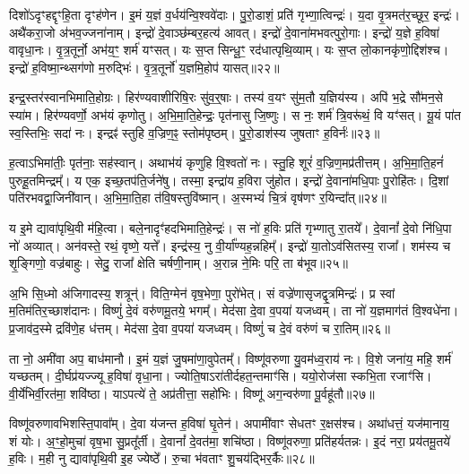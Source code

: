 दिशो॑\-ऽदृꣳहद्दृꣳहि॒ता दृꣳह॑णेन।
इ॒मं य॒ज्ञं व॒र्धय॑न्वि॒श्व\-वे॑दाः।
पु॒रो॒डाशं॒ प्रति॑ गृभ्णा॒त्विन्द्रः॑।
य॒दा वृ॒त्रमत॑र॒च्छूर॒ इन्द्रः॑।
अथै॑करा॒जो अ॑भव॒ज्जना॑नाम्।
इन्द्रो॑ दे॒वाञ्छ॑म्बर॒हत्य॑ आवत्।
इन्द्रो॑ दे॒वाना॑मभवत्पुरो॒गाः।
इन्द्रो॑ य॒ज्ञे ह॒विषा॑ वावृधा॒नः।
वृ॒त्र॒तूर्नो॒ अभ॑य॒ꣳ॒ शर्म॑ यꣳसत्।
यः स॒प्त सिन्धू॒ꣳ॒ रद॑धात्पृथि॒व्याम्।
यः स॒प्त लो॒कानकृ॑णो॒द्दिश॑श्च।
इन्द्रो॑ ह॒विष्मा॒न्थ्सग॑णो म॒रुद्भिः॑।
वृ॒त्र॒तूर्नो॑ य॒ज्ञमि॒होप॑ यासत्॥२२॥\ip\anuvakamend[व॒व॒र्थ॒ वि॒थ्स॒ इन्द्र॑स्तु॒राया᳚स्तु वृत्र॒तूर्ये॒ वज्र॑बाहुः पृथि॒व्यान्त्रीणि॑ च]

इन्द्र॒स्तर॑स्वानभिमाति॒होग्रः।
हिर॑ण्यवाशीरिषि॒रः सु॑व॒र्॒षाः।
तस्य॑ व॒यꣳ सु॑म॒तौ य॒ज्ञिय॑स्य।
अपि॑ भ॒द्रे सौ॑मन॒से स्या॑म।
हिर॑ण्यवर्णो॒ अभ॑यं कृणोतु।
अ॒भि॒मा॒ति॒हेन्द्रः॒ पृत॑नासु जि॒ष्णुः।
स नः॒ शर्म॑ त्रि॒वरू॑थं॒ वि यꣳ॑सत्।
यू॒यं पा॑त स्व॒स्तिभिः॒ सदा॑ नः।
इन्द्रꣴ॑ स्तुहि व॒ज्रिण॒ꣴ॒ स्तोम॑पृष्ठम्।
पु॒रो॒डाश॑स्य जुषताꣳ ह॒विर्नः॑॥२३॥\ip

ह॒त्वाऽभिमा॑तीः॒ पृत॑नाः॒ सह॑स्वान्।
अथाभ॑यं कृणुहि वि॒श्वतो॑ नः।
स्तु॒हि शूरं॑ व॒ज्रिण॒मप्र॑तीत्तम्।
अ॒भि॒मा॒ति॒हनं॑ पुरुहू॒तमिन्द्रम्᳚।
य एक॒ इच्छ॒तप॑ति॒र्जने॑षु।
तस्मा॒ इन्द्रा॑य ह॒विरा जु॑होत।
इन्द्रो॑ दे॒वाना॑मधि॒पाः पु॒रोहि॑तः।
दि॒शां पति॑रभवद्वा॒जिनी॑वान्।
अ॒भि॒मा॒ति॒हा त॑वि॒षस्तुवि॑ष्मान्।
अ॒स्मभ्यं॑ चि॒त्रं वृष॑णꣳ र॒यिन्दा᳚त्॥२४॥\ip

य इ॒मे द्यावा॑पृथि॒वी म॑हि॒त्वा।
बले॒नादृꣳ॑हदभिमाति॒हेन्द्रः॑।
स नो॑ ह॒विः प्रति॑ गृभ्णातु रा॒तये᳚।
दे॒वानां᳚ दे॒वो नि॑धि॒पा नो॑ अव्यात्।
अन॑वस्ते॒ रथं॒ वृष्णे॒ यत्ते᳚।
इन्द्र॑स्य॒ नु वी॒र्या᳚ण्यह॒न्नहिम्᳚।
इन्द्रो॑ या॒तो\-ऽव॑सितस्य॒ राजा᳚।
शम॑स्य च शृ॒ङ्गिणो॒ वज्र॑बाहुः।
सेदु॒ राजा᳚ क्षेति चर्\mbox{}षणी॒नाम्।
अ॒रान्न ने॒मिः परि॒ ता ब॑भूव॥२५॥\ip

अ॒भि सि॒ध्मो अ॑जिगादस्य॒ शत्रून्॑।
विति॒ग्मेन॑ वृष॒भेणा॒ पुरो॑भेत्।
सं वज्रे॑णासृजद्वृ॒त्र\-मिन्द्रः॑।
प्र स्वां म॒तिम॑तिर॒च्छाश॑दानः।
विष्णुं॑ दे॒वं वरु॑णमू॒तये॒ भगम्᳚।
मेद॑सा दे॒वा व॒पया॑ यजध्वम्।
ता नो॑ य॒ज्ञमाग॑तं वि॒श्वधे॑ना।
प्र॒जाव॑द॒स्मे द्रवि॑णे॒ह ध॑त्तम्।
मेद॑सा दे॒वा व॒पया॑ यजध्वम्।
विष्णुं॑ च दे॒वं वरु॑णं च रा॒तिम्॥२६॥\ip

ता नो॒ अमी॑वा अप॒ बाध॑मानौ।
इ॒मं य॒ज्ञं जु॒षमा॑णा॒वुपेतम्᳚।
विष्णू॑वरुणा यु॒वम॑ध्व॒राय॑ नः।
वि॒शे जना॑य॒ महि॒ शर्म॑ यच्छतम्।
दी॒र्घप्र॑यज्ज्यू ह॒विषा॑ वृधा॒ना।
ज्योति॒षा\-ऽरा॑तीर्दह\-त॒न्तमाꣳ॑सि।
ययो॒रोज॑सा स्कभि॒ता रजाꣳ॑सि।
वी॒र्ये॑भिर्वी॒रत॑मा॒ शवि॑ष्ठा।
याऽपत्ये॑ ते॒ अप्र॑तीत्ता॒ सहो॑भिः।
विष्णू॑ अग॒न्वरु॑णा पू॒र्वहू॑तौ॥२७॥\ip

विष्णू॑वरुणावभिशस्ति॒पावा᳚म्।
दे॒वा य॑जन्त ह॒विषा॑ घृ॒तेन॑।
अपामी॑वाꣳ सेधतꣳ र॒क्षस॑श्च।
अथा॑धत्तं॒ यज॑मानाय॒ शं योः।
अ॒ꣳ॒हो॒मुचा॑ वृष॒भा सु॒प्रतू᳚र्ती।
दे॒वानां᳚ दे॒वत॑मा॒ शचि॑ष्ठा।
विष्णू॑वरुणा॒ प्रति॑\-हर्यतन्नः।
इ॒दं नरा॒ प्रय॑तमू॒तये॑ ह॒विः।
म॒ही नु द्यावा॑पृथि॒वी इ॒ह ज्येष्ठे᳚।
रु॒चा भ॑वताꣳ शु॒चय॑द्भिर॒र्कैः॥२८॥\ip

